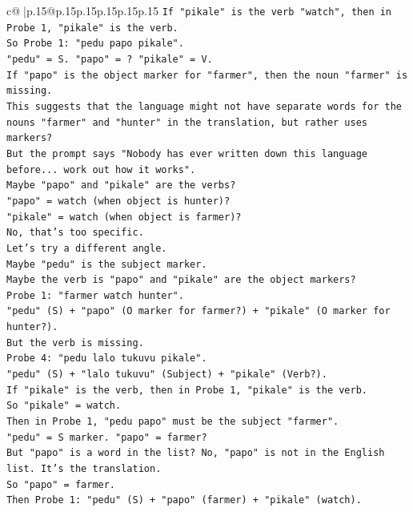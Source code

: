 \documentclass{article}
\begin{document}
{\begin{supertabular}{c@{$\;$}|p{.15\linewidth}@{}p{.15\linewidth}p{.15\linewidth}p{.15\linewidth}p{.15\linewidth}p{.15\linewidth}}
{{{\texttt{If "pikale" is the verb "watch", then in Probe 1, "pikale" is the verb.} \\
\texttt{So Probe 1: "pedu papo pikale".} \\
\texttt{"pedu" = S. "papo" = ? "pikale" = V.} \\
\texttt{If "papo" is the object marker for "farmer", then the noun "farmer" is missing.} \\
\texttt{This suggests that the language might not have separate words for the nouns "farmer" and "hunter" in the translation, but rather uses markers?} \\
\texttt{But the prompt says "Nobody has ever written down this language before... work out how it works".} \\
\texttt{Maybe "papo" and "pikale" are the verbs?} \\
\texttt{"papo" = watch (when object is hunter)?} \\
\texttt{"pikale" = watch (when object is farmer)?} \\
\texttt{No, that's too specific.} \\
\texttt{Let's try a different angle.} \\
\texttt{Maybe "pedu" is the subject marker.} \\
\texttt{Maybe the verb is "papo" and "pikale" are the object markers?} \\
\texttt{Probe 1: "farmer watch hunter".} \\
\texttt{"pedu" (S) + "papo" (O marker for farmer?) + "pikale" (O marker for hunter?).} \\
\texttt{But the verb is missing.} \\
\texttt{Probe 4: "pedu lalo tukuvu pikale".} \\
\texttt{"pedu" (S) + "lalo tukuvu" (Subject) + "pikale" (Verb?).} \\
\texttt{If "pikale" is the verb, then in Probe 1, "pikale" is the verb.} \\
\texttt{So "pikale" = watch.} \\
\texttt{Then in Probe 1, "pedu papo" must be the subject "farmer".} \\
\texttt{"pedu" = S marker. "papo" = farmer?} \\
\texttt{But "papo" is a word in the list? No, "papo" is not in the English list. It's the translation.} \\
\texttt{So "papo" = farmer.} \\
\texttt{Then Probe 1: "pedu" (S) + "papo" (farmer) + "pikale" (watch).} \\
}}}
\end{supertabular}}
\end{document}
